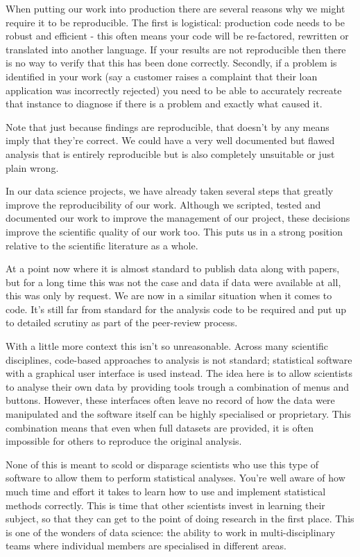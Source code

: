 \documentclass[
  letterpaper,
  DIV=11,
  numbers=noendperiod]{scrreprt}
\begin{document}
When putting our work into production there are several reasons why we
might require it to be reproducible. The first is logistical: production
code needs to be robust and efficient - this often means your code will
be re-factored, rewritten or translated into another language. If your
results are not reproducible then there is no way to verify that this
has been done correctly. Secondly, if a problem is identified in your
work (say a customer raises a complaint that their loan application was
incorrectly rejected) you need to be able to accurately recreate that
instance to diagnose if there is a problem and exactly what caused it.

Note that just because findings are reproducible, that doesn't by any
means imply that they're correct. We could have a very well documented
but flawed analysis that is entirely reproducible but is also completely
unsuitable or just plain wrong.

In our data science projects, we have already taken several steps that
greatly improve the reproducibility of our work. Although we scripted,
tested and documented our work to improve the management of our project,
these decisions improve the scientific quality of our work too. This
puts us in a strong position relative to the scientific literature as a
whole.

At a point now where it is almost standard to publish data along with
papers, but for a long time this was not the case and data if data were
available at all, this was only by request. We are now in a similar
situation when it comes to code. It's still far from standard for the
analysis code to be required and put up to detailed scrutiny as part of
the peer-review process.

With a little more context this isn't so unreasonable. Across many
scientific disciplines, code-based approaches to analysis is not
standard; statistical software with a graphical user interface is used
instead. The idea here is to allow scientists to analyse their own data
by providing tools trough a combination of menus and buttons. However,
these interfaces often leave no record of how the data were manipulated
and the software itself can be highly specialised or proprietary. This
combination means that even when full datasets are provided, it is often
impossible for others to reproduce the original analysis.

None of this is meant to scold or disparage scientists who use this type
of software to allow them to perform statistical analyses. You're well
aware of how much time and effort it takes to learn how to use and
implement statistical methods correctly. This is time that other
scientists invest in learning their subject, so that they can get to the
point of doing research in the first place. This is one of the wonders
of data science: the ability to work in multi-disciplinary teams where
individual members are specialised in different areas.
\end{document}

